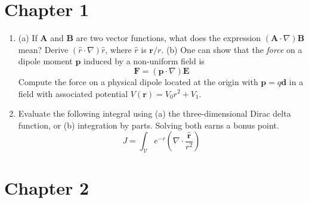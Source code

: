 \documentclass[10pt]{article}
\begin{document}
\twocolumn
\maketitle

\begin{abstract}
This exam may be completed at home, and covers chapters 1-4 of the course text and in-class examples.  Class notes and the course text may be used for review.  The course warm-up exercises are good study materials for this exam.
\end{abstract}
\noindent

\section{Chapter 1}

\begin{enumerate}
\item (a) If $\mathbf{A}$ and $\mathbf{B}$ are two vector functions, what does the expression $(\mathbf{A} \cdot \nabla) \mathbf{B}$ mean?  Derive $(\hat{r} \cdot \nabla) \hat{r}$, where $\hat{r}$ is $\mathbf{r}/r$. (b) One can show that the \textit{force} on a dipole moment $\mathbf{p}$ induced by a non-uniform field is
\begin{equation}
\mathbf{F} = (\mathbf{p} \cdot \nabla) \mathbf{E}
\end{equation}
Compute the force on a physical dipole located at the origin with $\mathbf{p} = q \mathbf{d}$ in a field with associated potential $V(\mathbf{r}) = V_0 r^2 + V_1$.
\item Evaluate the following integral using (a) the three-dimensional Dirac delta function, or (b) integration by parts.  Solving both earns a bonus point.
\begin{equation}
J = \int_{\mathcal{V}} e^{-r} \left( \nabla \cdot \frac{\mathbf{\hat{r}}}{r^2} \right)
\end{equation}
\end{enumerate}

\section{Chapter 2}
\end{document}
